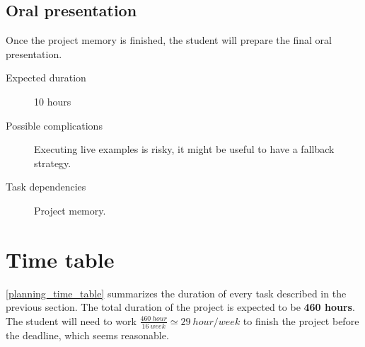\documentclass[a4paper,11pt,titlepage,abstract,numbers=noenddot,automark,mnsy,intlimits,rgb,dvipsnames]{report}
\begin{document}
\subsection{Oral presentation}
Once the project memory is finished, the student will prepare the final oral presentation.
\begin{description}
\item[Expected duration]
10 hours
\item[Possible complications]
Executing live examples is risky, it might be useful to have a fallback strategy.
\item[Task dependencies]
Project memory.
\end{description}
\clearpage
\section{Time table}
\autoref{planning_time_table} summarizes the duration of every task described in the previous section.
The total duration of the project is expected to be \textbf{460 hours}. The student will need to work
$\frac{460 \: hour}{16 \: week} \simeq 29 \: hour/week$ to finish the project before the deadline, which seems reasonable.
\end{document}
